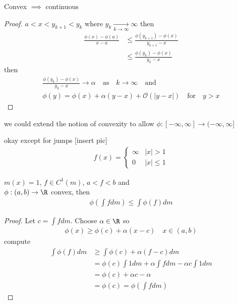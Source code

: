 \begin{lemma}
	Convex $\implies$ continuous
\end{lemma}

\begin{proof}
	$a < x < y_{k+1} < y_{k}$ where $y_{k} \xrightarrow[k \to \infty]{} \infty$ then
	\begin{align*}
		\frac{\phi(x) - \phi(a)}{x - a} &\leq \frac{\phi(y_{k+1}) - \phi (x)}{y_{k+1} - x} \\
										&\leq \frac{\phi(y_{k}) - \phi(x)}{y_{k} - x}
	\end{align*} then
	\begin{align*}
		\frac{\phi(y_{k}) - \phi(x)}{y_{k} - x} \to \alpha \quad \text{as} \quad k \to \infty \quad \text{and} \\
		\phi(y) = \phi(x) + \alpha (y - x) + \mathcal{O}( | y -x|) \quad \text{for} \quad y > x
	\end{align*} 
\end{proof}

\begin{remark}
	we could extend the notion of convexity to allow $\phi : [-\infty, \infty] \to (-\infty, \infty]$ 
	\begin{lemma}
		okay except for jumps [insert pic]
		\begin{align*}
			f(x) =
			\begin{cases}
				\infty & |x| > 1 \\
				0 &|x| \leq 1
			\end{cases}
		\end{align*} 
	\end{lemma}
	
\end{remark}

\begin{theorem}
	$m(x) = 1$, $f \in C^{1}(m)$, $a < f < b$ and \\ 
	$\phi : (a,b) \to \R$ convex, then
	\begin{align*}
		\phi\left(\int f dm \right) \leq \int \phi(f) dm
	\end{align*} 
\end{theorem}

\begin{proof}
	Let $c = \int f dm$. Choose $\alpha \in \R$ so
	\begin{align*}
		\phi (x) \geq \phi (c) + \alpha (x - c) \quad x \in (a,b)
	\end{align*} 
	compute
	\begin{align*}
		\int \phi (f) dm &\geq \int \phi (c) + \alpha (f -c) dm \\
						 &= \phi (c) \int 1 dm + \alpha \int f dm - \alpha c \int 1 dm \\
						 &= \phi (c) + \alpha c - \alpha \\
						 &= \phi (c) = \phi \left( \int f dm \right)
	\end{align*}
\end{proof}

